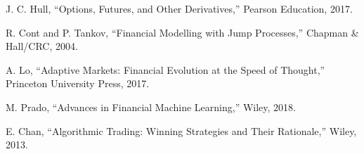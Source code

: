\documentclass[conference]{IEEEtran}
\begin{document}
\begin{thebibliography}{00}
 J. C. Hull, ``Options, Futures, and Other Derivatives,'' Pearson Education, 2017.

 R. Cont and P. Tankov, ``Financial Modelling with Jump Processes,'' Chapman \& Hall/CRC, 2004.

 A. Lo, ``Adaptive Markets: Financial Evolution at the Speed of Thought,'' Princeton University Press, 2017.

 M. Prado, ``Advances in Financial Machine Learning,'' Wiley, 2018.

 E. Chan, ``Algorithmic Trading: Winning Strategies and Their Rationale,'' Wiley, 2013.

\end{thebibliography}
\end{document}
